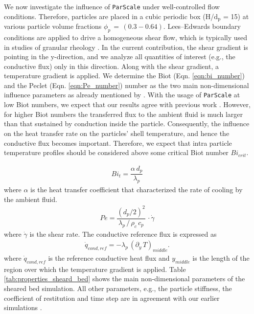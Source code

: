 \documentclass{particles2015}
\begin{document}
We now investigate the influence of \texttt{ParScale} under well-controlled flow conditions. Therefore, particles are placed in a cubic periodic box (H/$\text{d}_\text{p}$ = 15) at various particle volume fractions $\phi_p \, =  \, (0.3 - 0.64)$. Lees–Edwards boundary conditions are applied to drive a homogeneous shear flow, which is typically used in studies of granular rheology \cite{Chialvo2012}. In the current contribution, the shear gradient is pointing in the y-direction, and we analyze all quantities of interest (e.g., the conductive flux) only in this direction. Along with the shear gradient, a temperature gradient is applied. We determine the  Biot (Eqn. \ref{eqn:bi_number}) and the Peclet (Eqn. \ref{eqn:Pe_number}) number as the two main non-dimensional influence parameters as already mentioned by \cite{Mohan2014}. With the usage of \texttt{ParScale} at low Biot numbers, we expect that our results agree with previous work \cite{Mohan2014}. However, for higher Biot numbers the transferred flux to the ambient fluid is much larger than that sustained by conduction inside the particle. Consequently, the influence on the heat transfer rate on the particles' shell temperature, and hence the conductive flux becomes important. Therefore, we expect that intra particle temperature profiles should be considered above some critical Biot number $Bi_{crit}$.

\begin{align}
Bi_t = \dfrac{\alpha\, d_p}{\lambda_p}
\label{eqn:bi_number}
\end{align}
where $\alpha$ is the heat transfer coefficient that characterized the rate of cooling by the ambient fluid.
\begin{align}
Pe = \dfrac{(d_p/2)^2}{\lambda_p \, /\, \rho_c \, c_p} \, \cdot \dot{\gamma}
\label{eqn:Pe_number}
\end{align}  
where $\dot{\gamma}$ is the shear rate. The conductive reference flux is expressed as \cite{Chialvo2012}
\begin{align}
\dot{q}_{cond,ref} = - \lambda_p \, (\partial_y \, T)_{middle}.
\end{align}
where $\dot{q}_{cond,ref}$ is the reference conductive heat flux and $y_{middle}$ is the length of the region over which the temperature gradient is applied. Table \ref{tab:properties_sheard_bed} shows the main non-dimensional parameters of the sheared bed simulation.  All other parameters, e.g., the particle stiffness, the coefficient of restitution and time step are in agreement with our earlier simulations \cite{Mohan2014}.
\end{document}
